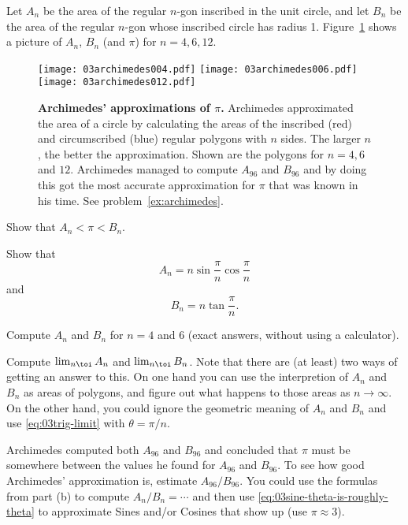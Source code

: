 
Let $A_n$ be the area of the regular $n$-gon inscribed in the unit
circle, and let $B_n$ be the area of the regular $n$-gon whose
inscribed circle has radius 1.  Figure~\ref{fig:03Archimedes} shows a
picture of $A_{n}$, $B_n$ (and $\pi$) for $n=4, 6, 12$.


\begin{figure}[b]
  \texttt{[image: 03archimedes004.pdf]}
  \texttt{[image: 03archimedes006.pdf]}
  \texttt{[image: 03archimedes012.pdf]}
  \caption{\textbf{Archimedes' approximations of $\pi$. } Archimedes
  approximated the area of a circle by calculating the areas of the
  inscribed (red) and circumscribed (blue) regular polygons with $n$ sides.  The
  larger $n$, the better the approximation.  Shown are the
  polygons for $n=4, 6$ and $12$.  Archimedes managed to compute
  $A_{96}$ and $B_{96}$ and by doing this got the most accurate
  approximation for $\pi$ that was known in his time.  See
  problem~\ref{ex:archimedes}.
  }
  \label{fig:03Archimedes}
\end{figure}

\subprob Show that $A_n < \pi < B_n$.

\subprob Show that
\[
A_n = n \sin\frac{\pi}{n} \cos\frac{\pi}{n}
\]
and
\[
B_n = n \tan\frac\pi n.
\]

\subprob Compute $A_n$ and $B_n$ for $n=4$ and $6$ (exact answers,
without using a calculator).

\subprob Compute $\lim_{n\toi}A_n$ and $\lim_{n\toi}B_n$.
Note that there are (at least) two ways of getting an answer to this.
On one hand you can use the interpretion of $A_n$ and $B_n$ as areas
of polygons, and figure out what happens to those areas as
$n\to\infty$.  On the other hand, you could ignore the geometric
meaning of $A_n$ and $B_n$ and use \ref{eq:03trig-limit} with
$\theta = \pi/n$.

\subprob Archimedes computed both $A_{96}$ and $B_{96}$ and concluded
that $\pi$ must be somewhere between the values he found for $A_{96}$
and $B_{96}$.  To see how good Archimedes' approximation is, estimate
$A_{96}/B_{96}$.  You could use the formulas from part (b) to compute
$A_n/B_n= \cdots$ and then use
\eqref{eq:03sine-theta-is-roughly-theta} to approximate Sines and/or
Cosines that show up (use $\pi\approx 3$).
